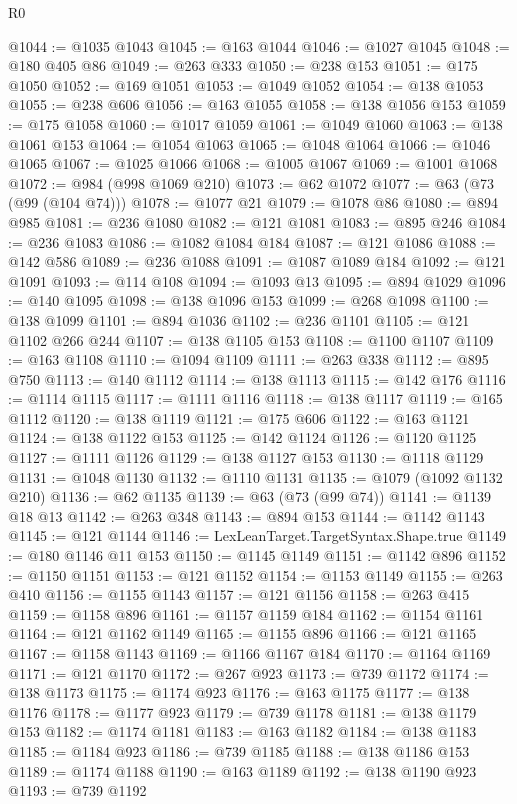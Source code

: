 \begin{lexlean}{R0}
\begin{coremodule}
@1044 := @1035 @1043
@1045 := @163 @1044
@1046 := @1027 @1045
@1048 := @180 @405 @86
@1049 := @263 @333
@1050 := @238 @153
@1051 := @175 @1050
@1052 := @169 @1051
@1053 := @1049 @1052
@1054 := @138 @1053
@1055 := @238 @606
@1056 := @163 @1055
@1058 := @138 @1056 @153
@1059 := @175 @1058
@1060 := @1017 @1059
@1061 := @1049 @1060
@1063 := @138 @1061 @153
@1064 := @1054 @1063
@1065 := @1048 @1064
@1066 := @1046 @1065
@1067 := @1025 @1066
@1068 := @1005 @1067
@1069 := @1001 @1068
@1072 := @984 (@998 @1069 @210)
@1073 := @62 @1072
@1077 := @63 (@73 (@99 (@104 @74)))
@1078 := @1077 @21
@1079 := @1078 @86
@1080 := @894 @985
@1081 := @236 @1080
@1082 := @121 @1081
@1083 := @895 @246
@1084 := @236 @1083
@1086 := @1082 @1084 @184
@1087 := @121 @1086
@1088 := @142 @586
@1089 := @236 @1088
@1091 := @1087 @1089 @184
@1092 := @121 @1091
@1093 := @114 @108
@1094 := @1093 @13
@1095 := @894 @1029
@1096 := @140 @1095
@1098 := @138 @1096 @153
@1099 := @268 @1098
@1100 := @138 @1099
@1101 := @894 @1036
@1102 := @236 @1101
@1105 := @121 @1102 @266 @244
@1107 := @138 @1105 @153
@1108 := @1100 @1107
@1109 := @163 @1108
@1110 := @1094 @1109
@1111 := @263 @338
@1112 := @895 @750
@1113 := @140 @1112
@1114 := @138 @1113
@1115 := @142 @176
@1116 := @1114 @1115
@1117 := @1111 @1116
@1118 := @138 @1117
@1119 := @165 @1112
@1120 := @138 @1119
@1121 := @175 @606
@1122 := @163 @1121
@1124 := @138 @1122 @153
@1125 := @142 @1124
@1126 := @1120 @1125
@1127 := @1111 @1126
@1129 := @138 @1127 @153
@1130 := @1118 @1129
@1131 := @1048 @1130
@1132 := @1110 @1131
@1135 := @1079 (@1092 @1132 @210)
@1136 := @62 @1135
@1139 := @63 (@73 (@99 @74))
@1141 := @1139 @18 @13
@1142 := @263 @348
@1143 := @894 @153
@1144 := @1142 @1143
@1145 := @121 @1144
@1146 := LexLeanTarget.TargetSyntax.Shape.true
@1149 := @180 @1146 @11 @153
@1150 := @1145 @1149
@1151 := @1142 @896
@1152 := @1150 @1151
@1153 := @121 @1152
@1154 := @1153 @1149
@1155 := @263 @410
@1156 := @1155 @1143
@1157 := @121 @1156
@1158 := @263 @415
@1159 := @1158 @896
@1161 := @1157 @1159 @184
@1162 := @1154 @1161
@1164 := @121 @1162 @1149
@1165 := @1155 @896
@1166 := @121 @1165
@1167 := @1158 @1143
@1169 := @1166 @1167 @184
@1170 := @1164 @1169
@1171 := @121 @1170
@1172 := @267 @923
@1173 := @739 @1172
@1174 := @138 @1173
@1175 := @1174 @923
@1176 := @163 @1175
@1177 := @138 @1176
@1178 := @1177 @923
@1179 := @739 @1178
@1181 := @138 @1179 @153
@1182 := @1174 @1181
@1183 := @163 @1182
@1184 := @138 @1183
@1185 := @1184 @923
@1186 := @739 @1185
@1188 := @138 @1186 @153
@1189 := @1174 @1188
@1190 := @163 @1189
@1192 := @138 @1190 @923
@1193 := @739 @1192

\end{coremodule}
\end{lexlean}
